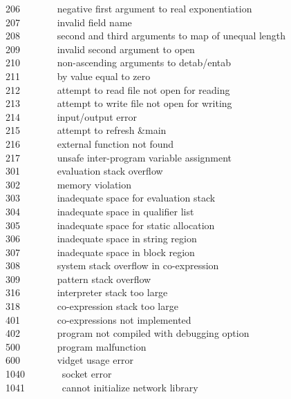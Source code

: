 206 \ \ \ \ \ \ \ negative first argument to real exponentiation\\
207 \ \ \ \ \ \ \ invalid field name\\
208 \ \ \ \ \ \ \ second and third arguments to map of unequal
length\\
209 \ \ \ \ \ \ \ invalid second argument to open\\
210 \ \ \ \ \ \ \ non-ascending arguments to detab/entab\\
211 \ \ \ \ \ \ \ by value equal to zero\\
212 \ \ \ \ \ \ \ attempt to read file not open for reading\\
213 \ \ \ \ \ \ \ attempt to write file not open for writing\\
214 \ \ \ \ \ \ \ input/output error\\
215 \ \ \ \ \ \ \ attempt to refresh \&main\\
216 \ \ \ \ \ \ \ external function not found\\
217 \ \ \ \ \ \ \ unsafe inter-program variable assignment\\
301 \ \ \ \ \ \ \ evaluation stack overflow\\
302 \ \ \ \ \ \ \ memory violation\\
303 \ \ \ \ \ \ \ inadequate space for evaluation stack\\
304 \ \ \ \ \ \ \ inadequate space in qualifier list\\
305 \ \ \ \ \ \ \ inadequate space for static allocation\\
306 \ \ \ \ \ \ \ inadequate space in string region\\
307 \ \ \ \ \ \ \ inadequate space in block region\\
308 \ \ \ \ \ \ \ system stack overflow in co-expression\\
309 \ \ \ \ \ \ \ pattern stack overflow\\
316 \ \ \ \ \ \ \ interpreter stack too large\\
318 \ \ \ \ \ \ \ co-expression stack too large\\
401 \ \ \ \ \ \ \ co-expressions not implemented\\
402 \ \ \ \ \ \ \ program not compiled with debugging option\\
500 \ \ \ \ \ \ \ program malfunction\\
600 \ \ \ \ \ \ \ vidget usage error\\
1040 \ \ \ \ \ \ \ socket error \\
1041 \ \ \ \ \ \ \ cannot initialize network library \\
